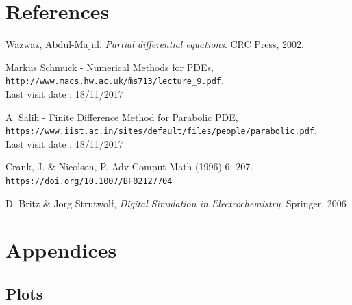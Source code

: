 \documentclass{article}
\begin{document}

    \newpage
    \section{References}
    \begin{thebibliography}{9}
        Wazwaz, Abdul-Majid. \textit{Partial differential equations}. CRC Press, 2002.

        Markus Schmuck - Numerical Methods for PDEs,
        \\\texttt{http://www.macs.hw.ac.uk/\~ms713/lecture\_9.pdf}.
        \\Last visit date : 18/11/2017

        A. Salih - Finite Difference Method for Parabolic PDE,
        \\\texttt{https://www.iist.ac.in/sites/default/files/people/parabolic.pdf}.
        \\Last visit date : 18/11/2017

        
        Crank, J. & Nicolson, P. Adv Comput Math (1996) 6: 207. 
        \\\texttt{https://doi.org/10.1007/BF02127704}

        D. Britz \& Jorg Strutwolf, \textit{Digital Simulation in Electrochemistry}.
        Springer, 2006

        
        
    \end{thebibliography}
    \newpage
    \section{Appendices}
        \subsection{Plots}
\end{document}
